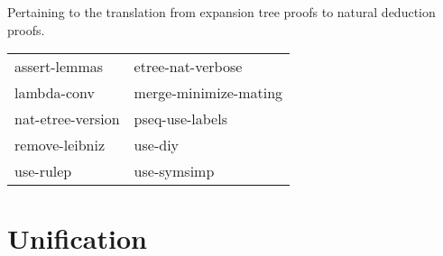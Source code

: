 \begin{description} 
\item[ETR-NAT]  
Pertaining to the translation from expansion tree proofs to
natural deduction proofs.

\begin{tabular}{l l}
assert-lemmas&etree-nat-verbose\\
lambda-conv&merge-minimize-mating\\
nat-etree-version&pseq-use-labels\\
remove-leibniz&use-diy\\
use-rulep&use-symsimp\\
\end{tabular}
\item
\end{description}

\section{Unification}

